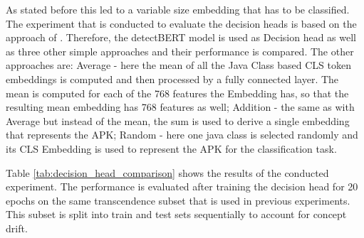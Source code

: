 As stated before this led to a variable size embedding that
has to be classified.
The experiment that is conducted to evaluate the decision heads is based on 
the approach of \cite{detectbert}. Therefore, the detectBERT model is used as 
Decision head as well as three other simple approaches and their performance 
is compared.
The other approaches are: 
Average - here the mean of all the Java Class based
CLS token embeddings is computed and then processed by a fully connected layer.
The mean is computed for each of the 768 features the Embedding has, so that the
resulting mean embedding has 768 features as well;
Addition - the same as with Average but instead of the mean, the sum is used to
derive a single embedding that represents the APK;
Random - here one java class is selected randomly and its CLS Embedding is used to 
represent the APK for the classification task.

Table \ref{tab:decision_head_comparison} shows the results of the conducted experiment.
The performance is evaluated after training the decision head for 20 epochs on 
the same transcendence subset that is used in previous experiments. This subset 
is split into train and test sets sequentially to account for concept drift.

\begin{table}[b]
    \centering
    \caption{\label{tab:decision_head_comparison}Performance comparison of different decision heads on the Transcend dataset with a time-based split.}
\end{table}

